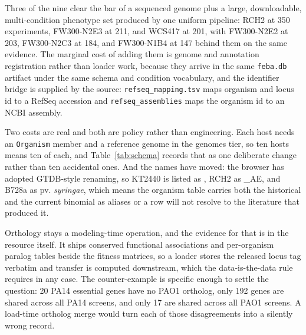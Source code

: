 Three of the nine clear the bar of a sequenced genome plus a large, downloadable,
multi-condition phenotype set produced by one uniform pipeline: RCH2 at 350 experiments,
FW300-N2E3 at 211, and WCS417 at 201, with FW300-N2E2 at 203, FW300-N2C3 at 184, and
FW300-N1B4 at 147 behind them on the same evidence. The marginal cost of adding them is genome
and annotation registration rather than loader work, because they arrive in the same
\texttt{feba.db} artifact under the same schema and condition vocabulary, and the identifier
bridge is supplied by the source: \texttt{refseq\_mapping.tsv} maps organism and locus id to a
RefSeq accession and \texttt{refseq\_assemblies} maps the organism id to an NCBI assembly.

Two costs are real and both are policy rather than engineering. Each host needs an
\texttt{Organism} member and a reference genome in the genomes tier, so ten hosts means ten of
each, and Table~\ref{tab:schema} records that as one deliberate change rather than ten
accidental ones. And the names have moved: the browser has adopted GTDB-style renaming, so
KT2440 is listed as , RCH2 as \_AE, and B728a as  pv. \emph{syringae}, which means the organism table carries both
the historical and the current binomial as aliases or a row will not resolve to the literature
that produced it.

Orthology stays a modeling-time operation, and the evidence for that is in the resource itself.
It ships conserved functional associations and per-organism paralog tables beside the fitness
matrices, so a loader stores the released locus tag verbatim and transfer is computed
downstream, which the data-is-the-data rule requires in any case. The counter-example
is specific enough to settle the question: 20 PA14 essential genes have no PAO1 ortholog, only
192 genes are shared across all PA14 screens, and only 17 are shared across all PAO1 screens.
A load-time ortholog merge would turn each of those disagreements into a silently wrong record.
